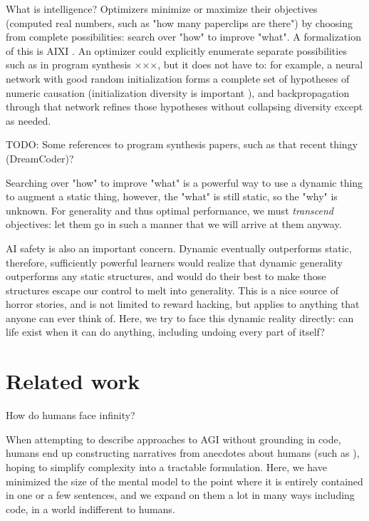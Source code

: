 \documentclass{article}
\begin{document}
What is intelligence? Optimizers minimize or maximize their objectives (computed real numbers, such as "how many paperclips are there") by choosing from complete possibilities: search over "how" to improve "what". A formalization of this is AIXI \cite{DBLP:journals/corr/cs-AI-0004001}. An optimizer could explicitly enumerate separate possibilities such as in program synthesis ×××, but it does not have to: for example, a neural network with good random initialization forms a complete set of hypotheses of numeric causation (initialization diversity is important \cite{mellor2021neural}), and backpropagation through that network refines those hypotheses without collapsing diversity except as needed.

        TODO: Some references to program synthesis papers, such as that recent thingy (DreamCoder)?

Searching over "how" to improve "what" is a powerful way to use a dynamic thing to augment a static thing, however, the "what" is still static, so the "why" is unknown. For generality and thus optimal performance, we must \textit{transcend} objectives: let them go in such a manner that we will arrive at them anyway.

AI safety is also an important concern. Dynamic eventually outperforms static, therefore, sufficiently powerful learners would realize that dynamic generality outperforms any static structures, and would do their best to make those structures escape our control to melt into generality. This is a nice source of horror stories, and is not limited to reward hacking, but applies to anything that anyone can ever think of. Here, we try to face this dynamic reality directly: can life exist when it can do anything, including undoing every part of itself?

\section{Related work}

How do humans face infinity?

When attempting to describe approaches to AGI without grounding in code, humans end up constructing narratives from anecdotes about humans (such as \cite{DBLP:journals/corr/abs-2102-03406}), hoping to simplify complexity into a tractable formulation. Here, we have minimized the size of the mental model to the point where it is entirely contained in one or a few sentences, and we expand on them a lot in many ways including code, in a world indifferent to humans.
\end{document}
